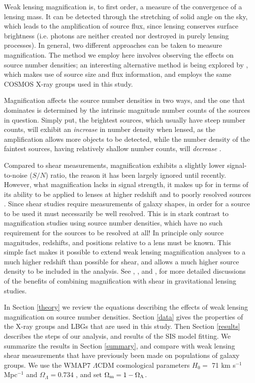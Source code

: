 Weak lensing magnification is, to first order, a measure of the convergence of a lensing mass.  It can be detected through the stretching of solid angle on the sky, which leads to the amplification of source flux, since lensing conserves surface brightness (i.e. photons are neither created nor destroyed in purely lensing processes). In general, two different approaches can be taken to measure magnification.  The method we employ here involves observing the effects on source number densities; an interesting alternative method is being explored by \citet{Schmidt12}, which makes use of source size and flux information, and employs the same \ac{COSMOS} X-ray groups used in this study.

Magnification affects the source number densities in two ways, and the one that dominates is determined by the intrinsic magnitude number counts of the sources in question.  Simply put, the brightest sources, which usually have steep number counts, will exhibit an {\it increase} in number density when lensed, as the amplification allows more objects to be detected, while the number density of the faintest sources, having relatively shallow number counts, will {\it decrease} \citep{Narayan89}.

Compared to shear measurements, magnification exhibits a slightly lower signal-to-noise ($S/N$) ratio, the reason it has been largely ignored until recently.  However, what magnification lacks in signal strength, it makes up for in terms of its ability to be applied to lenses at higher redshift and to poorly resolved sources \citep{Waerbeke10}.  Since shear studies require measurements of galaxy shapes, in order for a source to be used it must necessarily be well resolved.  This is in stark contrast to magnification studies using source number densities, which have no such requirement for the sources to be resolved at all!  In principle only source magnitudes, redshifts, and positions relative to a lens must be known.  This simple fact makes it possible to extend weak lensing magnification analyses to a much higher redshift than possible for shear, and allows a much higher source density to be included in the analysis.  See \citet{Waerbeke10}, \citet{RozoSchmidt10}, and \citet{Umetsu11}, for more detailed discussions of the benefits of combining magnification with shear in gravitational lensing studies. 

In Section \ref{theory} we review the equations describing the effects of weak lensing magnification on source number densities.  Section \ref{data} gives the properties of the X-ray groups and \ac{LBG}s that are used in this study.  Then Section \ref{results} describes the steps of our analysis, and results of the \ac{SIS} model fitting.  We summarize the results in Section \ref{summary}, and compare with weak lensing shear measurements that have previously been made on populations of galaxy groups.  We use the WMAP7 $\Lambda$CDM cosmological parameters $H_0 =$ 71 km s$^{-1}$ Mpc$^{-1}$ and $\Omega_{\Lambda} = 0.734$ \citep{WMAP7}, and set $\Omega_{\rm m} = 1 - \Omega_{\Lambda}$.

